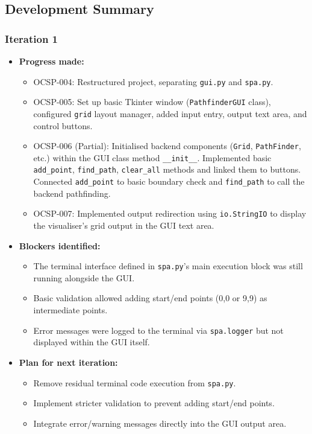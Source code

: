 \newpage

\subsection{Development Summary}


\subsubsection{Iteration 1}
\begin{itemize}
	\item \textbf{Progress made:}
	\begin{itemize}
		\item OCSP-004: Restructured project, separating \verb|gui.py| and \verb|spa.py|.
		\item OCSP-005: Set up basic Tkinter window (\verb|PathfinderGUI| class), configured \verb|grid| layout manager, added input entry, output text area, and control buttons.
		\item OCSP-006 (Partial): Initialised backend components (\verb|Grid|, \verb|PathFinder|, etc.) within the GUI class method \verb|__init__|. Implemented basic \verb|add_point|, \verb|find_path|, \verb|clear_all| methods and linked them to buttons. Connected \verb|add_point| to basic boundary check and \verb|find_path| to call the backend pathfinding.
		\item OCSP-007: Implemented output redirection using \verb|io.StringIO| to display the visualiser's grid output in the GUI text area.
	\end{itemize}
	\item \textbf{Blockers identified:}
	\begin{itemize}
		\item The terminal interface defined in \verb|spa.py|'s main execution block was still running alongside the GUI.
		\item Basic validation allowed adding start/end points (0,0 or 9,9) as intermediate points.
		\item Error messages were logged to the terminal via \verb|spa.logger| but not displayed within the GUI itself.
	\end{itemize}
	\item \textbf{Plan for next iteration:}
	\begin{itemize}
		\item Remove residual terminal code execution from \verb|spa.py|.
		\item Implement stricter validation to prevent adding start/end points.
		\item Integrate error/warning messages directly into the GUI output area.
	\end{itemize}
\end{itemize}


